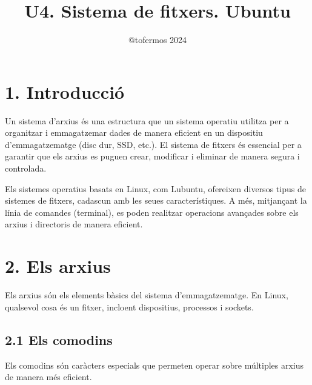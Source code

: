 \documentclass[
  12 pt,
  a4paper,
]{article}
\title{U4. Sistema de fitxers. Ubuntu}
\author{@tofermos 2024}
\date{}
\begin{document}
\maketitle

{
\setcounter{tocdepth}{2}
\tableofcontents
}
\newpage
\renewcommand\tablename{Tabla}

\section{1. Introducció}\label{introducciuxf3}

Un sistema d'arxius és una estructura que un sistema operatiu utilitza
per a organitzar i emmagatzemar dades de manera eficient en un
dispositiu d'emmagatzematge (disc dur, SSD, etc.). El sistema de fitxers
és essencial per a garantir que els arxius es puguen crear, modificar i
eliminar de manera segura i controlada.

Els sistemes operatius basats en Linux, com Lubuntu, ofereixen diversos
tipus de sistemes de fitxers, cadascun amb les seues característiques. A
més, mitjançant la línia de comandes (terminal), es poden realitzar
operacions avançades sobre els arxius i directoris de manera eficient.

\section{2. Els arxius}\label{els-arxius}

Els arxius són els elements bàsics del sistema d'emmagatzematge. En
Linux, qualsevol cosa és un fitxer, incloent dispositius, processos i
sockets.

\subsection{2.1 Els comodins}\label{els-comodins}

Els comodins són caràcters especials que permeten operar sobre múltiples
arxius de manera més eficient.
\end{document}

